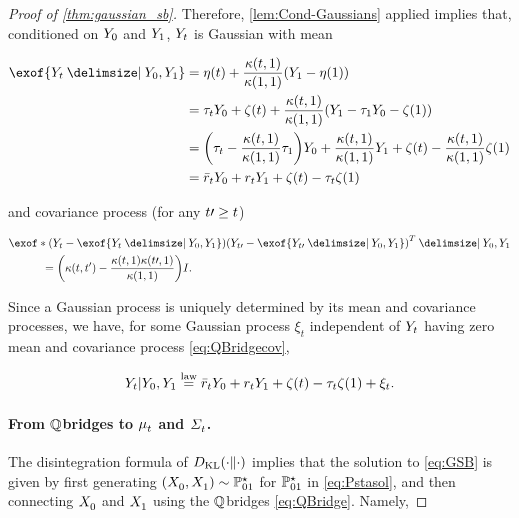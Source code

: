 \begin{proof}[Proof of \cref{thm:gaussian_sb}]
Therefore, \cref{lem:Cond-Gaussians} applied implies that, conditioned on $\refsde[0]$ and $\refsde[\horizon]$, $\refsde$ is Gaussian with mean

\begin{align}
\nn
\exof{  \refsde \given \refsde[0], \refsde[\horizon] } &= \mYcinit + \frac{\kernel[\ctime][\horizon]}{ \kernel[\horizon][\horizon] }\parens*{ \refsde[\horizon] - \mYcinit[\horizon] } \\
\nn
&= \aggtime \refsde[0] + \tshift + \frac{\kernel[\ctime][\horizon]}{ \kernel[\horizon][\horizon] }\parens*{ \refsde[\horizon] - \aggtime[\horizon]\refsde[0] - \tshift[\horizon] } \\
\nn
&= \parens*{  \aggtime -  \frac{\kernel[\ctime][\horizon]}{ \kernel[\horizon][\horizon] } \aggtime[\horizon] } \refsde[0] +  \frac{\kernel[\ctime][\horizon]}{ \kernel[\horizon][\horizon] } \refsde[\horizon] + \tshift -  \frac{\kernel[\ctime][\horizon]}{ \kernel[\horizon][\horizon] } \tshift[\horizon]  \\
\label{eq:QBridgem}
&= \ratioc \refsde[0] + \ratio \refsde[\horizon] + \tshift - \aggtime \tshift[\horizon]
\end{align}

and covariance process (for any $\ctime\prime \geq \ctime$)

\begin{align}
\label{eq:QBridgecov}
&\exof*{ \parens*{ \refsde - \exof{  \refsde \given \refsde[0], \refsde[\horizon] } }\parens*{ \refsde[\ctime\prime] - \exof{  \refsde[\ctime\prime] \given \refsde[0], \refsde[\horizon] } }^T  \given \refsde[0], \refsde[\horizon]  } \\
\nn 
&\quad\quad\quad= \parens*{   \kernel - \frac{\kernel[\ctime][\horizon] \kernel[\ctime\prime][\horizon]}{ \kernel[\horizon][\horizon]} } \eye.
\end{align}

Since a Gaussian process is uniquely determined by its mean and covariance processes, we have, for some Gaussian process $\xi_t$ independent of $\refsde$ having zero mean and covariance process \eqref{eq:QBridgecov},

\begin{equation}
\label{eq:QBridge}
\refsde \vert \refsde[0], \refsde[\horizon] \eqlaw \ratioc \refsde[0] + \ratio \refsde[\horizon] + \tshift - \aggtime \tshift[\horizon] + \xi_t.
\end{equation}


\paragraph{From $\refprobase$\textendash bridges to $\meansol$ and $\Sigmasol$.}
The disintegration formula of $\KL(\cdot \| \cdot)$ \citep{leonard2013survey} implies that the solution to \eqref{eq:GSB} is given by first generating $(\Xsol[0], \Xsol[\horizon]) \sim \Pstasol$ for $\Pstasol$ in \eqref{eq:Pstasol}, and then connecting $\Xsol[0]$ and $\Xsol[\horizon]$ using the $\refprobase$\textendash bridges \eqref{eq:QBridge}. Namely,


\end{proof}
